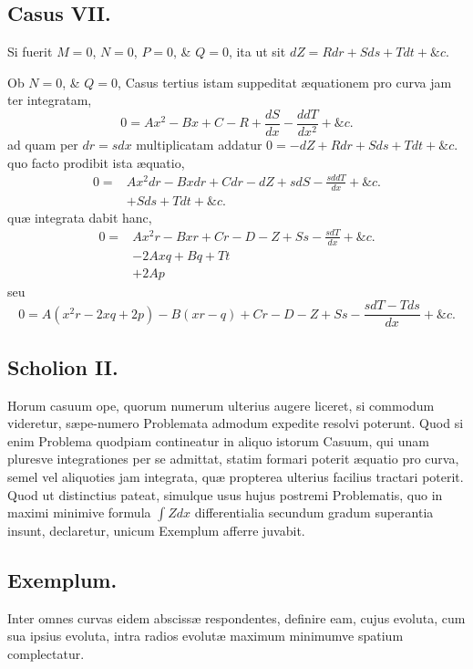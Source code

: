 \subsection*{Casus VII.}
Si fuerit $M=0$, $N=0$, $P=0$, \& $Q=0$, ita ut sit $dZ=Rdr+Sds+Tdt+\&c.$

Ob $N=0$, \& $Q=0$, Casus tertius istam suppeditat æquationem pro curva jam ter integratam,
\[0=Ax^2-Bx+C-R+\frac{dS}{dx}-\frac{ddT}{dx^2}+\&c.\]
ad quam per $dr=sdx$ multiplicatam addatur $0=-dZ+Rdr+Sds+Tdt+\&c.$ quo facto prodibit ista æquatio,
\[\begin{aligned}
0={}&Ax^2dr-Bxdr+Cdr-dZ+sdS-\frac{sddT}{dx}+\&c.\\
&+Sds+Tdt+\&c.
\end{aligned}\]
quæ integrata dabit hanc,
\[\begin{aligned}
0={}&Ax^2r-Bxr+Cr-D-Z+Ss-\frac{sdT}{dx}+\&c.\\
&-2Axq+Bq+Tt\\
&+2Ap
\end{aligned}\]
seu
\[0=A(x^2r-2xq+2p)-B(xr-q)+Cr-D-Z+Ss-\frac{sdT-Tds}{dx}+\&c.\]

\subsection*{Scholion II.}
Horum casuum ope, quorum numerum ulterius augere liceret, si commodum videretur, sæpe-numero Problemata admodum expedite resolvi poterunt. Quod si enim Problema quodpiam contineatur in aliquo istorum Casuum, qui unam pluresve integrationes per se admittat, statim formari poterit æquatio pro curva, semel vel aliquoties jam integrata, quæ propterea ulterius facilius tractari poterit. Quod ut distinctius pateat, simulque usus hujus postremi Problematis, quo in maximi minimive formula $\int Zdx$ differentialia secundum gradum superantia insunt, declaretur, unicum Exemplum afferre juvabit.

\subsection*{Exemplum.}
Inter omnes curvas eidem abscissæ respondentes, definire eam, cujus evoluta, cum sua ipsius evoluta, intra radios evolutæ maximum minimumve spatium complectatur.


